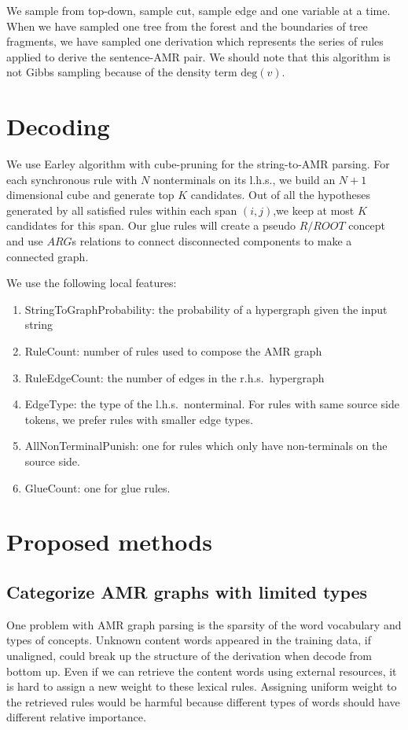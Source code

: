 We sample from top-down, sample cut, sample edge and one variable at a time. When we have sampled one tree from the forest
and the boundaries of tree fragments, we have sampled one derivation which represents the series of rules applied to derive
the sentence-AMR pair. We should note that this algorithm is not Gibbs sampling because of the density term $\mbox{deg}(v)$.
\section{Decoding}
We use Earley algorithm with cube-pruning \cite{ChiangCL} for the string-to-AMR parsing. 
For each synchronous rule with $N$ nonterminals on its l.h.s., we build an $N+1$ dimensional cube and generate top $K$ candidates. 
Out of all the hypotheses generated by all satisfied rules within each span $(i,j)$,we keep at most $K$ candidates for this span.
Our glue rules will create a pseudo $R/ROOT$ concept and use $ARG$s relations to connect
disconnected components to make a connected graph.


We use the following local features:
\begin{enumerate}\footnotesize
    \item StringToGraphProbability: the probability of a hypergraph given the input string
    \item RuleCount: number of rules used to compose the AMR graph
    \item RuleEdgeCount: the number of edges in the r.h.s.\ hypergraph 
    \item EdgeType: the type of the l.h.s.\ nonterminal. For rules with same source side tokens, we prefer rules with smaller edge types.
    \item AllNonTerminalPunish: one for rules which only have non-terminals on the source side.
    \item GlueCount: one for glue rules.  
\end{enumerate}

\section{Proposed methods}
\subsection{Categorize AMR graphs with limited types}
One problem with AMR graph parsing is the sparsity of the word vocabulary and types of concepts. Unknown content words appeared in the training data, if unaligned, could
break up the structure of the derivation when decode from bottom up. Even if we can retrieve the content words using external resources, it is hard to assign a new weight to these lexical rules.
Assigning uniform weight to the retrieved rules would be harmful because different types of words should have different relative importance.


